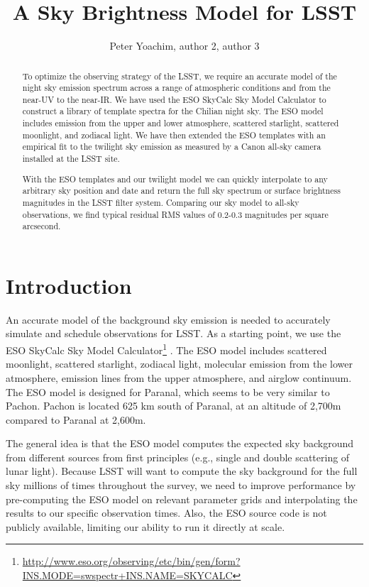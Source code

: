 \documentclass{emulateapj}  %
\begin{document}
\title{A Sky Brightness Model for LSST}


\author{Peter Yoachim, author 2, author 3}


\begin{abstract}
  To optimize the observing strategy of the LSST, we require an accurate model of the night sky emission spectrum across a range of atmospheric conditions and from the near-UV to the near-IR.  We have used the ESO SkyCalc Sky Model Calculator \citep{Noll12,Jones13} to construct a library of template spectra for the Chilian night sky.  The ESO model includes emission from the upper and lower atmosphere, scattered starlight, scattered moonlight, and zodiacal light.
  We have then extended the ESO templates with an empirical fit to the twilight sky emission as measured by a Canon all-sky camera installed at the LSST site.

  With the ESO templates and our twilight model we can quickly interpolate to any arbitrary sky position and date and return the full sky spectrum or surface brightness magnitudes in the LSST filter system. Comparing our sky model to all-sky observations, we find typical residual RMS values of 0.2-0.3 magnitudes per square arcsecond.
\end{abstract}


\section{Introduction}

An accurate model of the background sky emission is needed to accurately simulate and schedule observations for LSST.  As a starting point, we use the ESO SkyCalc Sky Model Calculator\footnote{\url{http://www.eso.org/observing/etc/bin/gen/form?} \url{INS.MODE=swspectr+INS.NAME=SKYCALC}} \citep{Noll12,Jones13}.  The ESO model includes scattered moonlight, scattered starlight, zodiacal light, molecular emission from the lower atmosphere, emission lines from the upper atmosphere, and airglow continuum.  The ESO model is designed for Paranal, which seems to be very similar to Pachon.  Pachon is located 625 km south of Paranal, at an altitude of 2,700m compared to Paranal at 2,600m.  

The general idea is that the ESO model computes the expected sky background from different sources from first principles (e.g., single and double scattering of lunar light). Because LSST will want to compute the sky background for the full sky millions of times throughout the survey, we need to improve performance by pre-computing the ESO model on relevant parameter grids and interpolating the results to our specific observation times. Also, the ESO source code is not publicly available, limiting our ability to run it directly at scale.
\end{document}
